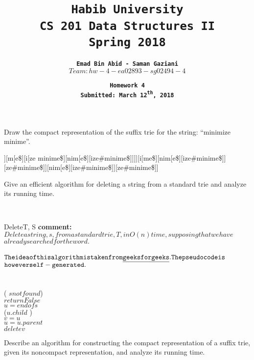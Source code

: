 \documentclass[addpoints]{exam}
\title{\textbf{\tt Habib University}\\ \textbf{\tt CS 201 Data Structures II}\\ \textbf{\tt Spring 2018}}
\author{\textbf{\tt Emad Bin Abid - Saman Gaziani}\\ {\tt $Team: hw-4-ea02893-sg02494-4$}}
\date{\textbf{\tt Homework 4}\\ \textbf{\tt Submitted: March 12\textsuperscript{th}, 2018}}
\begin{document}
\maketitle

\begin{questions}

  \question[10] %
  Draw the compact representation of the suffix trie for the string: ``minimize minime''.

  \begin{solution}
    \begin{forest}
    	[[\#minime][e[\$][minime\$]][m[e\$][i[ze minime\$][nim[e\$][ize\#minime\$]]]][i[me\$][nim[e\$][ize\#minime\$]][ze\#minime\$]][nim[e\$][ize\#minime\$]][ze\#minime\$]]
    \end{forest}
  \end{solution}
\newpage
  \question[10]%
  Give an efficient algorithm for deleting a string from a standard trie and
  analyze its running time.

  \begin{solution}\\
  	\begin{pseudocode}{Delete}{T, S}
  		\textbf{comment: }$Delete a string, s, from a standard trie, T, in O(n) time, supposing that we have$ \\$already  searched for the word.$\\ \\
  		
  		${\tt The idea of this algorithm is taken from \underline{geeksforgeeks}. The pseudocode is}$\\ ${\tt however self-generated.}$\\ \\
  		
  		\\
  		
  		\IF( $s not found$)
  		\THEN \\
  		$return False $\\
  		
  		$u = end of s$ \\ 
  		\WHILE ($u.child$ )
  		\DO \\
  		$v = u$\\
  		$u = u.parent$ \\ 
  		$delete v$  \\
  		
  		\ENDPROCEDURE
  	\end{pseudocode}
  \end{solution}
  \newpage
  \question[10]  %
  Describe an algorithm for constructing the compact representation of a suffix trie, given its noncompact representation, and analyze its running time.


\end{questions}
\end{document}
